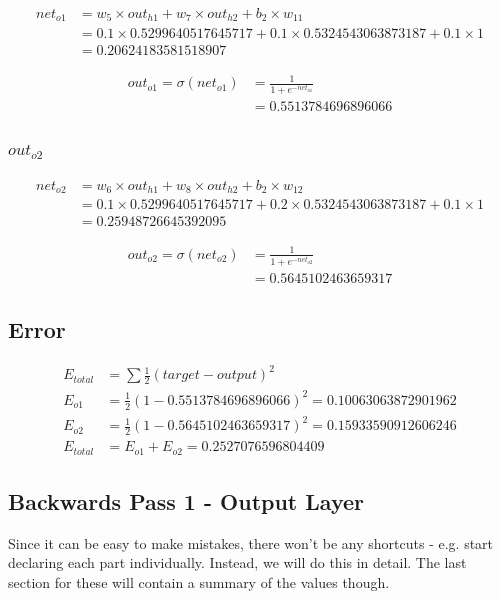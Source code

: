 \documentclass{article}
\begin{document}
\begin{align*}
    net_{o1} & = w_{5} \times out_{h1} + w_{7} \times out_{h2} + b_{2} \times w_{11} \\
    & = 0.1 \times 0.5299640517645717 + 0.1 \times  0.5324543063873187 + 0.1 \times 1 \\
    & = 0.20624183581518907
\end{align*}

\begin{align*}
    out_{o1} = \sigma(net_{o1}) & = \frac{1}{1 + e^{-net_{o1}}} \\
    & = 0.5513784696896066
\end{align*}

\subsubsection{$out_{o2}$}
\begin{align*}
    net_{o2} & = w_{6} \times out_{h1} + w_{8} \times out_{h2} + b_{2} \times w_{12} \\
    & = 0.1 \times 0.5299640517645717 + 0.2 \times  0.5324543063873187 + 0.1 \times 1 \\
    & =  0.25948726645392095
\end{align*}

\begin{align*}
    out_{o2} = \sigma(net_{o2}) & = \frac{1}{1 + e^{-net_{o2}}} \\
    & = 0.5645102463659317
\end{align*}

\subsection{Error}
\begin{align*}
    E_{total} & = \sum \frac{1}{2} (target-output)^2 \\
    E_{o1} & = \frac{1}{2}(1-0.5513784696896066)^2 = 0.10063063872901962 \\
    E_{o2} & = \frac{1}{2}(1-0.5645102463659317)^2 = 0.15933590912606246 \\
    E_{total} & = E_{o1} + E_{o2} = 0.2527076596804409
\end{align*}

\subsection{Backwards Pass 1 - Output Layer}
Since it can be easy to make mistakes, there won't be any shortcuts - e.g. start
declaring each part individually. Instead, we will do this in detail. The last
section for these will contain a summary of the values though.
\end{document}
